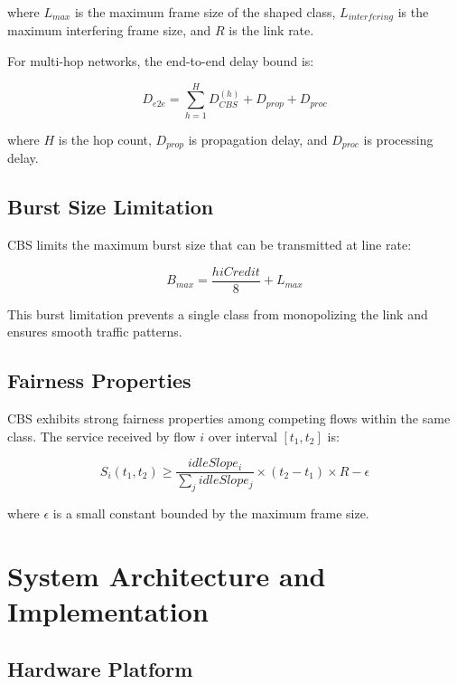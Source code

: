 \documentclass[10pt, journal, compsoc]{IEEEtran}
\begin{document}
where $L_{max}$ is the maximum frame size of the shaped class, $L_{interfering}$ is the maximum interfering frame size, and $R$ is the link rate.

For multi-hop networks, the end-to-end delay bound is:

\begin{equation}
D_{e2e} = \sum_{h=1}^{H} D_{CBS}^{(h)} + D_{prop} + D_{proc}
\end{equation}

where $H$ is the hop count, $D_{prop}$ is propagation delay, and $D_{proc}$ is processing delay.

\subsection{Burst Size Limitation}

CBS limits the maximum burst size that can be transmitted at line rate:

\begin{equation}
B_{max} = \frac{hiCredit}{8} + L_{max}
\end{equation}

This burst limitation prevents a single class from monopolizing the link and ensures smooth traffic patterns.

\subsection{Fairness Properties}

CBS exhibits strong fairness properties among competing flows within the same class. The service received by flow $i$ over interval $[t_1, t_2]$ is:

\begin{equation}
S_i(t_1, t_2) \geq \frac{idleSlope_i}{\sum_j idleSlope_j} \times (t_2 - t_1) \times R - \epsilon
\end{equation}

where $\epsilon$ is a small constant bounded by the maximum frame size.

\section{System Architecture and Implementation}
\label{sec:system_architecture}

\subsection{Hardware Platform}
\end{document}
